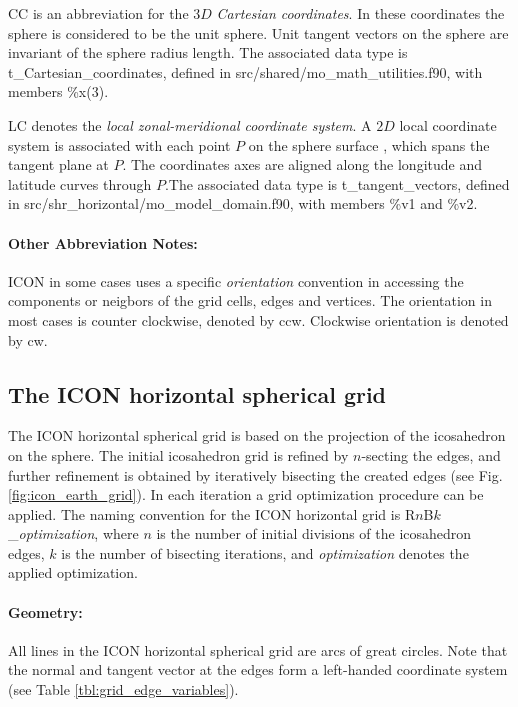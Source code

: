 \documentclass[a4paper,11pt,DIV16,BCOR1cm,titlepage]{scrartcl}
\begin{document}
CC is an abbreviation for the $3D$ \emph{Cartesian coordinates}. 
In these coordinates the sphere is considered to be the unit sphere.
Unit tangent vectors on the sphere are invariant of the sphere radius length.
The associated data type is t\_Cartesian\_coordinates, defined in 
src/shared/mo\_math\_utilities.f90, with members \%x(3).

LC denotes the \emph{local zonal-meridional coordinate system}. 
A $2D$ local coordinate system is associated with
each point $P$ on the sphere surface , which spans the tangent plane at $P$.
The coordinates axes are aligned along the longitude and latitude curves 
through $P$.The associated data type is t\_tangent\_vectors, defined in 
src/shr\_horizontal/mo\_model\_domain.f90, with members \%v1 and \%v2.

\paragraph{Other Abbreviation Notes:}
ICON in some cases uses a specific \emph{orientation} convention in accessing the 
components or neigbors of the grid cells, edges and vertices. The orientation in 
most cases is counter clockwise, denoted by ccw. Clockwise orientation is denoted by cw.



\subsection{The ICON horizontal spherical grid}
\label{sec:icon_horizontal_spherical_grid}



The ICON horizontal spherical grid is based on the projection of the icosahedron on the sphere.
The initial icosahedron grid is refined by $n$-secting the edges, and further refinement 
is obtained by iteratively bisecting the created edges (see Fig. \ref{fig:icon_earth_grid}). 
In each iteration a grid optimization procedure can be applied. 
The naming convention for the ICON horizontal grid is R$n$B$k$\_\textit{optimization}, 
where $n$ is the number  of initial divisions of the icosahedron edges, 
$k$ is the number of bisecting iterations, 
and \textit{optimization} denotes the applied optimization.


\paragraph{Geometry:}
All lines in the ICON horizontal spherical grid are arcs of great circles.
Note that the normal and tangent vector at the edges form a left-handed coordinate system
(see Table  \ref{tbl:grid_edge_variables}).
\end{document}
